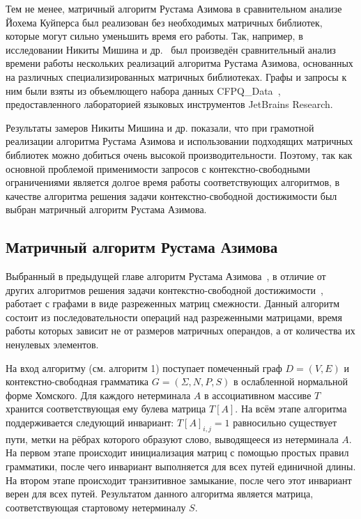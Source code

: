 Тем не менее, матричный алгоритм Рустама Азимова в сравнительном анализе Йохема Куйперса был реализован без необходимых матричных библиотек, которые могут сильно уменьшить время его работы. Так, например, в исследовании Никиты Мишина и др.~\cite{azimov-evalution} был произведён сравнительный анализ времени работы нескольких реализаций алгоритма Рустама Азимова, основанных на различных специализированных матричных библиотеках. Графы и запросы к ним были взяты из объемлющего набора данных CFPQ\_Data~\cite{cfpq-data}, предоставленного лабораторией языковых инструментов JetBrains Research. 

Результаты замеров Никиты Мишина и др. показали, что при грамотной реализации алгоритма Рустама Азимова и использовании подходящих матричных библиотек можно добиться очень высокой производительности. Поэтому, так как основной проблемой применимости запросов с контекстно-свободными ограничениями является долгое время работы соответствующих алгоритмов, в качестве алгоритма решения задачи конте\-кстно-свободной достижимости был выбран матричный алгоритм Рустама Азимова.

\subsection{Матричный алгоритм Рустама Азимова}\label{sec:matrix-algo}
Выбранный в предыдущей главе алгоритм Рустама Азимова~\cite{Azimov:2018:CPQ:3210259.3210264}, в отличие от других алгоритмов решения задачи контекстно-свободной достижимости~\cite{hellings-2015, santos-2018, zhlang-2016}, работает с графами в виде разреженных матриц смежности. Данный алгоритм состоит из последовательности операций над разреженными матрицами, время работы которых зависит не от размеров матричных операндов, а от количества их ненулевых элементов.

На вход алгоритму (см. алгоритм 1) поступает помеченный граф $D=(V,E)$ и контекстно-свободная грамматика $G=(\Sigma, N, P, S)$ в ослабленной нормальной форме Хомского. Для каждого нетерминала $A$ в ассоциативном массиве $T$ хранится соответствующая ему булева матрица $T[A]$. На всём этапе алгоритма поддерживается следующий инвариант: $T[A]_{i,j} = 1$ равносильно существует пути, метки на рёбрах которого образуют слово, выводящееся из нетерминала $A$. На первом этапе происходит инициализация матриц с помощью простых правил грамматики, после чего инвариант выполняется для всех путей единичной длины. На втором этапе происходит транзитивное замыкание, после чего этот инвариант верен для всех путей. Результатом данного алгоритма является матрица, соответствующая стартовому нетерминалу $S$.

